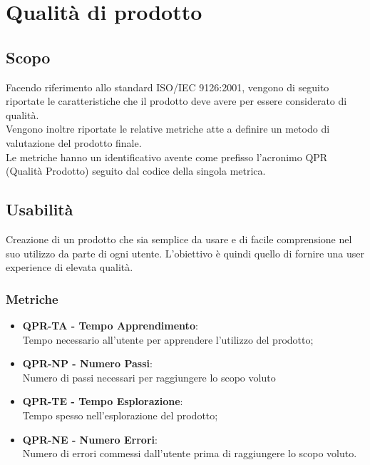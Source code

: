 
\section{Qualità di prodotto}
\subsection{Scopo}
Facendo riferimento allo standard ISO/IEC 9126:2001, vengono di seguito riportate le caratteristiche che il prodotto deve avere per essere considerato di qualità. \\
Vengono inoltre riportate le relative metriche atte a definire un metodo di valutazione del prodotto finale.\\
Le metriche hanno un identificativo avente come prefisso l'acronimo QPR (Qualità Prodotto) seguito dal codice della singola metrica.\\

\subsection{Usabilità}
Creazione di un prodotto che sia semplice da usare e di facile comprensione nel suo utilizzo da parte di ogni utente.
L'obiettivo è quindi quello di fornire una user experience di elevata qualità.
\subsubsection{Metriche}
\begin{itemize}
    \item \textbf{QPR-TA - Tempo Apprendimento}:\\ Tempo necessario all'utente per apprendere l'utilizzo del prodotto;
    \item \textbf{QPR-NP - Numero Passi}:\\ Numero di passi necessari per raggiungere lo scopo voluto
    \item \textbf{QPR-TE - Tempo Esplorazione}:\\ Tempo spesso nell'esplorazione del prodotto;
    \item \textbf{QPR-NE - Numero Errori}:\\ Numero di errori commessi dall'utente prima di raggiungere lo scopo voluto.
\end{itemize}
